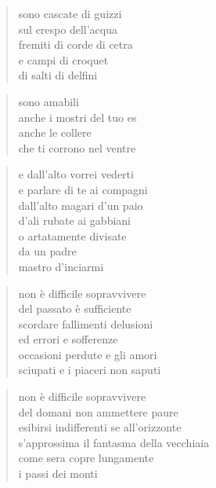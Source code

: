 	\begin{verse}
		sono cascate di guizzi\\
		sul crespo dell’acqua\\
		fremiti di corde di cetra\\
		e campi di croquet\\
		di salti di delfini
	\end{verse}

	\begin{verse}
		sono amabili\\
		anche i mostri del tuo es\\
		anche le collere\\
		che ti corrono nel ventre
	\end{verse}

	\begin{verse}
		e dall’alto vorrei vederti\\
		e parlare di te ai compagni\\
		dall’alto magari d’un paio\\
		d’ali rubate ai gabbiani\\
		o artatamente divisate\\
		da un padre\\
		mastro d’inciarmi
	\end{verse}

\clearpage


\vspace*{2cm}

	\begin{verse}
		non è difficile sopravvivere\\
		del passato è sufficiente\\
		scordare fallimenti delusioni\\
		ed errori e sofferenze\\
		occasioni perdute e gli amori\\
		sciupati e i piaceri non saputi
	\end{verse}

	\begin{verse}
		non è difficile sopravvivere\\
		del domani non ammettere paure\\
		esibirsi indifferenti se all’orizzonte\\
		s’approssima il fantasma della vecchiaia\\
		come sera copre lungamente\\
		i passi dei monti
	\end{verse}


